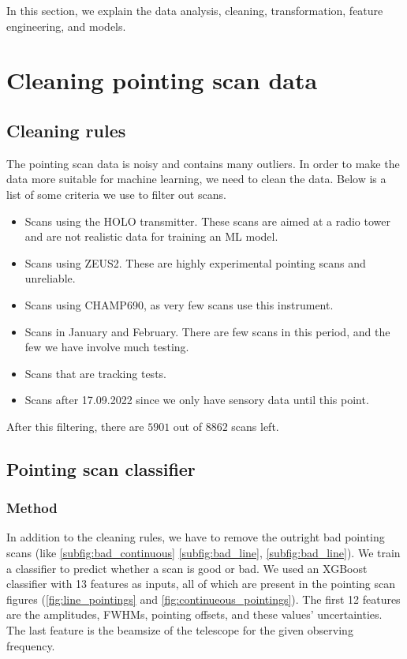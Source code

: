 In this section, we explain the data analysis, cleaning, transformation, feature engineering, and models.

\section{Cleaning pointing scan data}
\subsection{Cleaning rules}
The pointing scan data is noisy and contains many outliers.
In order to make the data more suitable for machine learning, we need to clean the data.
Below is a list of some criteria we use to filter out scans.
\begin{itemize}
    \item Scans using the HOLO transmitter.
    These scans are aimed at a radio tower and are not realistic data for training an ML model.
    \item Scans using ZEUS2.
    These are highly experimental pointing scans and unreliable.
    \item Scans using CHAMP690, as very few scans use this instrument.
    \item Scans in January and February.
    There are few scans in this period, and the few we have involve much testing.
    \item Scans that are tracking tests.
    \item Scans after 17.09.2022 since we only have sensory data until this point.
\end{itemize}   
After this filtering, there are $5901$ out of $8862$ scans left.
        
\subsection{Pointing scan classifier}
\subsubsection{Method}
In addition to the cleaning rules, we have to remove the outright bad pointing scans (like \ref{subfig:bad_continuous} \ref{subfig:bad_line}, \ref{subfig:bad_line}).
We train a classifier to predict whether a scan is good or bad.
We used an XGBoost classifier with 13 features as inputs, all of which are present in the pointing scan figures (\ref{fig:line_pointings} and \ref{fig:continueous_pointings}).
The first 12 features are the amplitudes, FWHMs, pointing offsets, and these values' uncertainties.
The last feature is the beamsize of the telescope for the given observing frequency.\\

